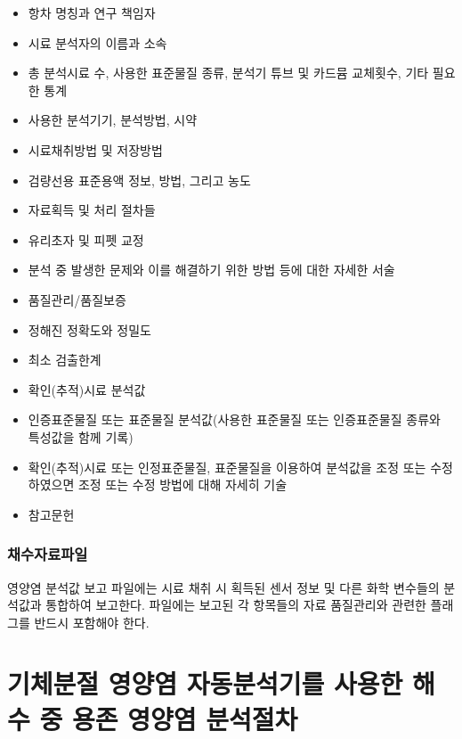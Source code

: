 \documentclass[
]{book}
\providecommand{\tightlist}{%
  \setlength{\itemsep}{0pt}\setlength{\parskip}{0pt}}
\begin{document}
\begin{itemize}
\tightlist
\item
  항차 명칭과 연구 책임자
\item
  시료 분석자의 이름과 소속
\item
  총 분석시료 수, 사용한 표준물질 종류, 분석기 튜브 및 카드뮴 교체횟수, 기타 필요한 통계
\item
  사용한 분석기기, 분석방법, 시약
\item
  시료채취방법 및 저장방법
\item
  검량선용 표준용액 정보, 방법, 그리고 농도
\item
  자료획득 및 처리 절차들
\item
  유리초자 및 피펫 교정
\item
  분석 중 발생한 문제와 이를 해결하기 위한 방법 등에 대한 자세한 서술
\item
  품질관리/품질보증
\item
  정해진 정확도와 정밀도
\item
  최소 검출한계
\item
  확인(추적)시료 분석값
\item
  인증표준물질 또는 표준물질 분석값(사용한 표준물질 또는 인증표준물질 종류와 특성값을 함께 기록)
\item
  확인(추적)시료 또는 인정표준물질, 표준물질을 이용하여 분석값을 조정 또는 수정하였으면 조정 또는 수정 방법에 대해 자세히 기술
\item
  참고문헌
\end{itemize}

\hypertarget{uxcc44uxc218uxc790uxb8ccuxd30cuxc77c}{%
\subsubsection{채수자료파일}\label{uxcc44uxc218uxc790uxb8ccuxd30cuxc77c}}

영양염 분석값 보고 파일에는 시료 채취 시 획득된 센서 정보 및 다른 화학 변수들의 분석값과 통합하여 보고한다. 파일에는 보고된 각 항목들의 자료 품질관리와 관련한 플래그를 반드시 포함해야 한다.

\hypertarget{uxae30uxccb4uxbd84uxc808-uxc601uxc591uxc5fc-uxc790uxb3d9uxbd84uxc11duxae30uxb97c-uxc0acuxc6a9uxd55c-uxd574uxc218-uxc911-uxc6a9uxc874-uxc601uxc591uxc5fc-uxbd84uxc11duxc808uxcc28}{%
\section{기체분절 영양염 자동분석기를 사용한 해수 중 용존 영양염 분석절차}\label{uxae30uxccb4uxbd84uxc808-uxc601uxc591uxc5fc-uxc790uxb3d9uxbd84uxc11duxae30uxb97c-uxc0acuxc6a9uxd55c-uxd574uxc218-uxc911-uxc6a9uxc874-uxc601uxc591uxc5fc-uxbd84uxc11duxc808uxcc28}}
\end{document}
